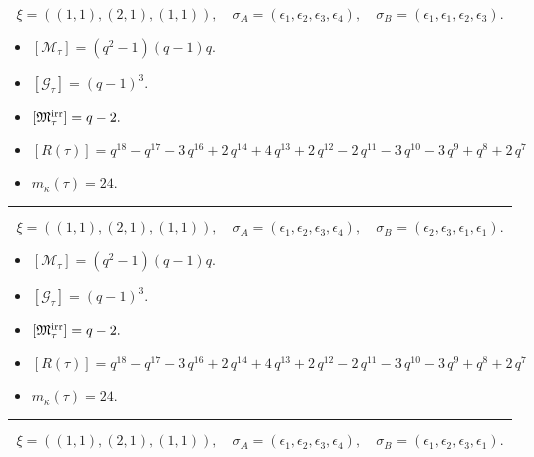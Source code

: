 \documentclass[10pt,a4paper]{amsart}
\begin{document}
$$\xi = ({(1, 1)}, {(2, 1)}, {(1, 1)}),\quad \sigma_A = ({{\epsilon_1}}, {{\epsilon_2, \epsilon_3}}, {{\epsilon_4}}),\quad \sigma_B = ({{\epsilon_1}}, {{\epsilon_1, \epsilon_2}}, {{\epsilon_3}}).$$

\begin{itemize}
 \item $[\mathcal{M}_{\tau}] = {\left(q^{2} - 1\right)} {\left(q - 1\right)} q .$

 \item $[\mathcal{G}_{\tau}] = {\left(q - 1\right)}^{3} .$

 \item $[{\frak M}_{\tau}^{\textrm{irr}}] = q - 2 .$

 \item $[R(\tau)] = q^{18} - q^{17} - 3 \, q^{16} + 2 \, q^{14} + 4 \, q^{13} + 2 \, q^{12} - 2 \, q^{11} - 3 \, q^{10} - 3 \, q^{9} + q^{8} + 2 \, q^{7} $

 \item $m_{\kappa}(\tau) = 24 .$

 \end{itemize}
\noindent\rule{8cm}{0.4pt}

$$\xi = ({(1, 1)}, {(2, 1)}, {(1, 1)}),\quad \sigma_A = ({{\epsilon_1}}, {{\epsilon_2, \epsilon_3}}, {{\epsilon_4}}),\quad \sigma_B = ({{\epsilon_2}}, {{\epsilon_3, \epsilon_1}}, {{\epsilon_1}}).$$

\begin{itemize}
 \item $[\mathcal{M}_{\tau}] = {\left(q^{2} - 1\right)} {\left(q - 1\right)} q .$

 \item $[\mathcal{G}_{\tau}] = {\left(q - 1\right)}^{3} .$

 \item $[{\frak M}_{\tau}^{\textrm{irr}}] = q - 2 .$

 \item $[R(\tau)] = q^{18} - q^{17} - 3 \, q^{16} + 2 \, q^{14} + 4 \, q^{13} + 2 \, q^{12} - 2 \, q^{11} - 3 \, q^{10} - 3 \, q^{9} + q^{8} + 2 \, q^{7} $

 \item $m_{\kappa}(\tau) = 24 .$

 \end{itemize}
\noindent\rule{8cm}{0.4pt}

$$\xi = ({(1, 1)}, {(2, 1)}, {(1, 1)}),\quad \sigma_A = ({{\epsilon_1}}, {{\epsilon_2, \epsilon_3}}, {{\epsilon_4}}),\quad \sigma_B = ({{\epsilon_1}}, {{\epsilon_2, \epsilon_3}}, {{\epsilon_1}}).$$
\end{document}
